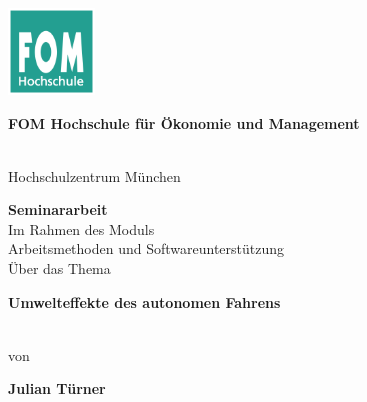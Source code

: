 \newcommand{\Thema}{Umwelteffekte des autonomen Fahrens}
\newcommand{\Name}{Julian Türner}
\newcommand{\Gutachter}{Dr. Herbert Bauer}
\newcommand{\Matrikelnummer}{581388}
\newcommand{\Abgabedatum}{09.01.2022}




\begin{titlepage}
	\begin{center}
		\includegraphics[width=2.3cm]{assets/fomLogo.pdf}\\
		\vspace{.5cm}
		\begin{Large}\textbf{FOM Hochschule für Ökonomie und Management}\end{Large}\\
		\vspace{.5cm}
		Hochschulzentrum München
																														
		\vspace{2cm}
	\end{center}
																												
	\bigskip	
																																																				
	\begin{center}
		\textbf{Seminararbeit}\\
		\vspace{0.2cm}
		Im Rahmen des Moduls\\
		\vspace{0.5cm}
		Arbeitsmethoden und Softwareunterstützung\\
		\vspace{2cm}
		Über das Thema\\
		\vspace{0.5cm}
		\begin{Large}\textbf{\textbf{\Thema}}\end{Large}\\
																												
		\vspace{2cm}
		von\\
		\vspace{0.5cm}
		\begin{Large}\textbf{\textbf{\Name}}\end{Large}\\
	\end{center}
																										

\end{titlepage}
